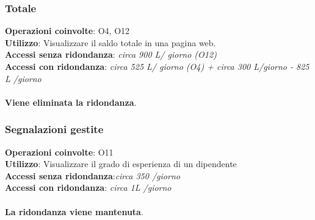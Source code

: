 \subsubsection{Totale}
\textbf{Operazioni coinvolte}: O4, O12  \\
\textbf{Utilizzo}: Visualizzare il saldo totale in una pagina web.\\
\textbf{Accessi senza ridondanza}: \textit{circa 900 L/ giorno (O12)}\\
\textbf{Accessi con ridondanza}: \textit{circa 525 L/ giorno (O4) + circa 300 L/giorno - 825 L /giorno}\\\\
\textbf{Viene eliminata la ridondanza}.

\subsubsection{Segnalazioni gestite}
\textbf{Operazioni coinvolte}: O11  \\
\textbf{Utilizzo}: Visualizzare il grado di esperienza di un dipendente\\
\textbf{Accessi senza ridondanza}:\textit{circa 350 /giorno}\\
\textbf{Accessi con ridondanza}: \textit{circa 1L /giorno}\\\\
\textbf{La ridondanza viene mantenuta}.